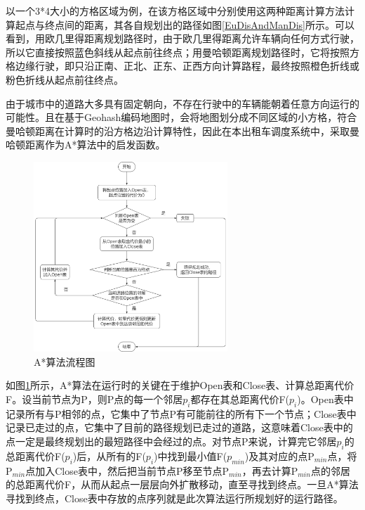 以一个3*4大小的方格区域为例，在该方格区域中分别使用这两种距离计算方法计算起点与终点间的距离，其各自规划出的路径如图\ref{EuDisAndManDis}所示。可以看到，用欧几里得距离规划路径时，由于欧几里得距离允许车辆向任何方式行驶，所以它直接按照蓝色斜线从起点前往终点；用曼哈顿距离规划路径时，它将按照方格边缘行驶，即只沿正南、正北、正东、正西方向计算路程，最终按照橙色折线或粉色折线从起点前往终点。

由于城市中的道路大多具有固定朝向，不存在行驶中的车辆能朝着任意方向运行的可能性。且在基于Geohash编码地图时，会将地图划分成不同区域的小方格，符合曼哈顿距离在计算时的沿方格边沿计算特性，因此在本出租车调度系统中，采取曼哈顿距离作为A*算法中的启发函数。

\begin{figure}[ht]
  \centering
  \includegraphics[width=0.65\textwidth]{undergraduate-thesis/images/Astar_Workway.png}
  \caption{A*算法流程图}
  \label{AstarWorkWay} %
\end{figure}

如图\ref{AstarWorkWay}所示，A*算法在运行时的关键在于维护Open表和Close表、计算总距离代价F。设当前节点为P，则P点的每一个邻居$p_i$都存在其总距离代价F($p_i$)。Open表中记录所有与P相邻的点，它集中了节点P有可能前往的所有下一个节点；Close表中记录已走过的点，它集中了目前的路径规划已走过的道路，这意味着Close表中的点一定是最终规划出的最短路径中会经过的点。对节点P来说，计算完它邻居$p_i$的总距离代价F($p_i$)后，从所有的F($p_i$)中找到最小值F($p_{min}$)及其对应的点P$_{min}$点，将P$_{min}$点加入Close表中，然后把当前节点P移至节点P$_{min}$，再去计算P$_{min}$点的邻居的总距离代价F，从而从起点一层层向外扩散移动，直至寻找到终点。一旦A*算法寻找到终点，Close表中存放的点序列就是此次算法运行所规划好的运行路径。

